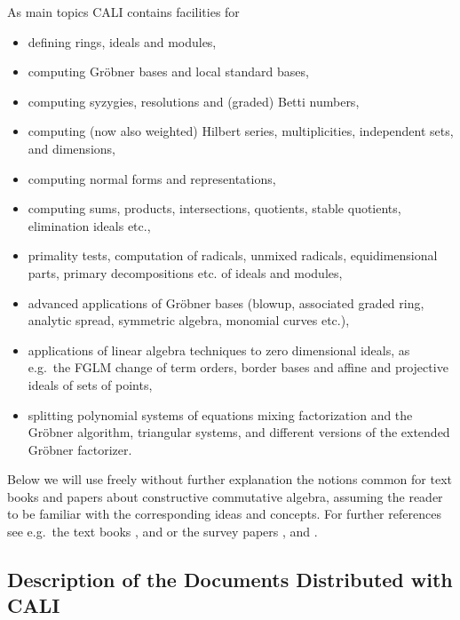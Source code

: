 \documentclass[a4paper,11pt]{article}
\newcommand{\gr}{Gr\"obner}
\begin{document}
As main topics CALI contains facilities for
\begin{itemize}
\item defining rings, ideals and modules,

\item computing {\gr} bases and local standard bases,

\item computing syzygies, resolutions and (graded) Betti numbers,

\item computing (now also weighted) Hilbert series, multiplicities,
independent sets, and dimensions,

\item computing normal forms and representations,

\item computing sums, products, intersections, quotients, stable
quotients, elimination ideals etc.,

\item primality tests, computation of radicals, unmixed radicals,
equidimensional parts, primary decompositions etc. of ideals and
modules,

\item advanced applications of {\gr} bases (blowup, associated graded
ring, analytic spread, symmetric algebra, monomial curves etc.),

\item applications of linear algebra techniques to zero dimensional
	ideals, as e.g.\ the FGLM change of term orders, border bases
	and affine and projective ideals of sets of points,

\item splitting polynomial systems of equations mixing factorization and
the {\gr} algorithm, triangular systems, and different versions of the
extended {\gr} factorizer. 

\end{itemize}

Below we will use freely without further explanation the notions
common for text books and papers about constructive commutative
algebra, assuming the reader to be familiar with the corresponding
ideas and concepts. For further references see e.g.\ the text books
\cite{BKW}, \cite{CLO} and \cite{Mishra} or the survey papers
\cite{B1}, \cite{B2} and \cite{Ro}. 

\subsection{Description of the Documents Distributed with CALI}
\end{document}
